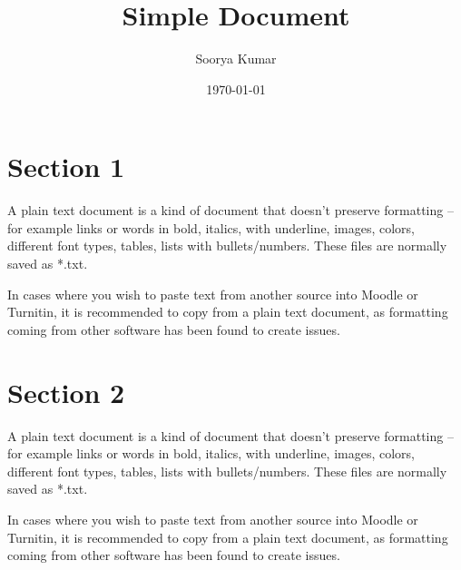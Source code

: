 \documentclass[12pt,a4paper]{article}
\title{\LARGE \textbf{Simple Document}}
\author{Soorya Kumar}
\date{\today}
\begin{document}
	\maketitle
	\thispagestyle{fancy}
	
	\section{Section 1}
		A plain text document is a kind of document that doesn’t preserve formatting – for example links or words in bold, italics, with underline, images, colors, different font types, tables, lists with bullets/numbers. These files are normally saved as *.txt.
		
		In cases where you wish to paste text from another source into Moodle or Turnitin, it is recommended to copy from a plain text document, as formatting coming from other software has been found to create issues.
	
	\section{Section 2}
		A plain text document is a kind of document that doesn’t preserve formatting – for example links or words in bold, italics, with underline, images, colors, different font types, tables, lists with bullets/numbers. These files are normally saved as *.txt.
		
		In cases where you wish to paste text from another source into Moodle or Turnitin, it is recommended to copy from a plain text document, as formatting coming from other software has been found to create issues.
	
	
\end{document}
